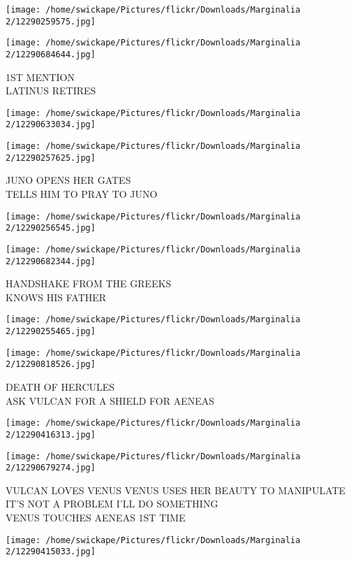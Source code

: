 \documentclass[10pt,letterpaper]{article}
\begin{document}
\texttt{[image: /home/swickape/Pictures/flickr/Downloads/Marginalia 2/12290259575.jpg]}

\vspace{0.25in}
\texttt{[image: /home/swickape/Pictures/flickr/Downloads/Marginalia 2/12290684644.jpg]}

1ST MENTION\\
LATINUS RETIRES
\pagebreak

\texttt{[image: /home/swickape/Pictures/flickr/Downloads/Marginalia 2/12290633034.jpg]}

\vspace{0.25in}
\texttt{[image: /home/swickape/Pictures/flickr/Downloads/Marginalia 2/12290257625.jpg]}

JUNO OPENS HER GATES\\
TELLS HIM TO PRAY TO JUNO
\pagebreak

\texttt{[image: /home/swickape/Pictures/flickr/Downloads/Marginalia 2/12290256545.jpg]}

\vspace{0.25in}
\texttt{[image: /home/swickape/Pictures/flickr/Downloads/Marginalia 2/12290682344.jpg]}

HANDSHAKE FROM THE GREEKS\\
KNOWS HIS FATHER
\pagebreak

\texttt{[image: /home/swickape/Pictures/flickr/Downloads/Marginalia 2/12290255465.jpg]}

\vspace{0.25in}
\texttt{[image: /home/swickape/Pictures/flickr/Downloads/Marginalia 2/12290818526.jpg]}

DEATH OF HERCULES\\
ASK VULCAN FOR A SHIELD FOR AENEAS
\pagebreak

\texttt{[image: /home/swickape/Pictures/flickr/Downloads/Marginalia 2/12290416313.jpg]}

\vspace{0.25in}
\texttt{[image: /home/swickape/Pictures/flickr/Downloads/Marginalia 2/12290679274.jpg]}

VULCAN LOVES VENUS VENUS USES HER BEAUTY TO MANIPULATE IT'S NOT A PROBLEM I'LL DO SOMETHING\\
VENUS TOUCHES AENEAS 1ST TIME
\pagebreak

\texttt{[image: /home/swickape/Pictures/flickr/Downloads/Marginalia 2/12290415033.jpg]}
\end{document}
